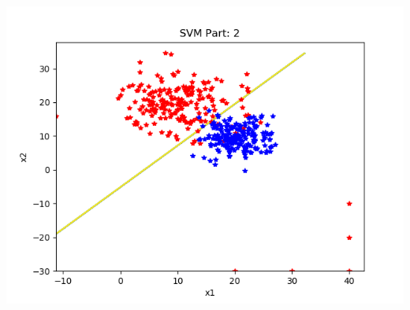 \documentclass[a4paper,11pt]{article}
\begin{document}
\begin{mlsolution}
  \includegraphics{svm2}
\end{mlsolution}
\end{document}
